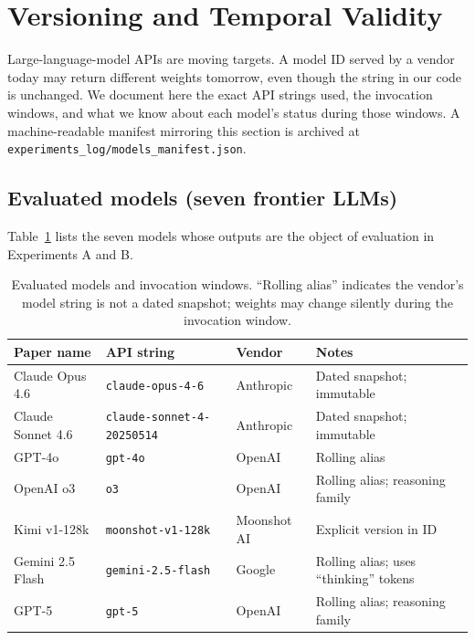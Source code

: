 
\section{Versioning and Temporal Validity}
\label{app:versioning}

Large-language-model APIs are moving targets. A model ID served by a
vendor today may return different weights tomorrow, even though the
string in our code is unchanged. We document here the exact API strings
used, the invocation windows, and what we know about each model's
status during those windows. A machine-readable manifest mirroring this
section is archived at
\texttt{experiments\_log/models\_manifest.json}.

\subsection{Evaluated models (seven frontier LLMs)}

Table~\ref{tab:eval-models} lists the seven models whose outputs are
the object of evaluation in Experiments A and B.

\begin{table}[h]
\centering
\small
\renewcommand{\arraystretch}{1.2}
\caption{Evaluated models and invocation windows. ``Rolling alias''
indicates the vendor's model string is not a dated snapshot; weights
may change silently during the invocation window.}
\label{tab:eval-models}
\begin{tabular}{llll}
\toprule
\textbf{Paper name} & \textbf{API string} & \textbf{Vendor} & \textbf{Notes} \\
\midrule
Claude Opus 4.6     & \texttt{claude-opus-4-6}          & Anthropic    & Dated snapshot; immutable \\
Claude Sonnet 4.6   & \texttt{claude-sonnet-4-20250514} & Anthropic    & Dated snapshot; immutable \\
GPT-4o              & \texttt{gpt-4o}                   & OpenAI       & Rolling alias \\
OpenAI o3           & \texttt{o3}                       & OpenAI       & Rolling alias; reasoning family \\
Kimi v1-128k        & \texttt{moonshot-v1-128k}         & Moonshot AI  & Explicit version in ID \\
Gemini 2.5 Flash    & \texttt{gemini-2.5-flash}         & Google       & Rolling alias; uses ``thinking'' tokens \\
GPT-5               & \texttt{gpt-5}                    & OpenAI       & Rolling alias; reasoning family \\
\bottomrule
\end{tabular}
\end{table}

